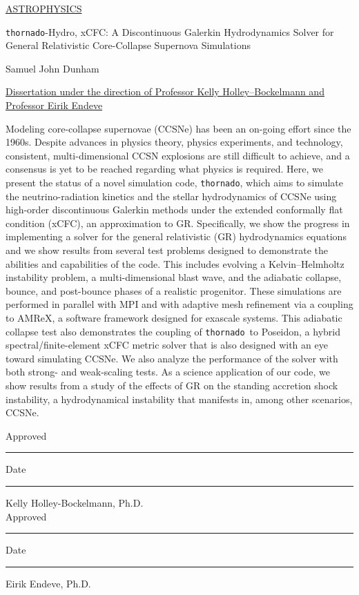 \documentclass[10pt]{article}
\newcommand{\thornado}{\texttt{thornado}}
\begin{document}

\begin{flushright}
\underline{ASTROPHYSICS}
\end{flushright}\vspace{1em}

\flushleft

\begin{center}
\thornado-Hydro, xCFC: A Discontinuous Galerkin Hydrodynamics
Solver for General Relativistic
Core-Collapse Supernova Simulations
\end{center}\vspace{1em}

\begin{center}
Samuel John Dunham
\end{center}\vspace{1em}

\centerline{\underline{Dissertation under the direction of
Professor Kelly Holley--Bockelmann and Professor Eirik Endeve}}
\vspace{1em}

\begin{doublespace}

Modeling core-collapse supernovae (CCSNe) has been an on-going effort
since the 1960s.
Despite advances in physics theory, physics experiments, and technology,
consistent, multi-dimensional CCSN explosions are still difficult to achieve,
and a consensus is yet to be reached regarding what physics is required.
Here, we present the status of a novel simulation code, \thornado,
which aims to simulate the neutrino-radiation kinetics
and the stellar hydrodynamics of
CCSNe using high-order discontinuous Galerkin methods
under the extended conformally flat condition (xCFC), an approximation to GR.
Specifically, we show the progress in implementing a
solver for the general relativistic (GR)
hydrodynamics equations and we show results from several test problems
designed to demonstrate the abilities and capabilities of the code.
This includes evolving a Kelvin--Helmholtz instability problem,
a multi-dimensional blast wave, and
the adiabatic collapse, bounce, and post-bounce phases
of a realistic progenitor.
These simulations are performed
in parallel with MPI and with adaptive mesh refinement via a coupling
to AMReX, a software framework designed for exascale systems.
This adiabatic collapse test also demonstrates the coupling of \thornado\ to
Poseidon, a hybrid spectral/finite-element xCFC metric solver
that is also designed
with an eye toward simulating CCSNe.
We also analyze the performance of the solver with both
strong- and weak-scaling tests.
As a science application of our code,
we show results from a study of the effects of GR on the
standing accretion shock instability, a hydrodynamical instability
that manifests in, among other scenarios, CCSNe.

\end{doublespace}
\vspace{3em}

\noindent Approved \rule[-3pt]{3.5in}{.5pt} \hskip 0.1in %
          Date     \rule[-3pt]{1.5in}{.5pt}
\hspace*{1.3in} Kelly Holley-Bockelmann, Ph.D. \\[0.15in]
\noindent Approved \rule[-3pt]{3.5in}{.5pt} \hskip 0.1in %
          Date     \rule[-3pt]{1.5in}{.5pt}
\hspace*{1.3in} Eirik Endeve, Ph.D.
\end{document}
